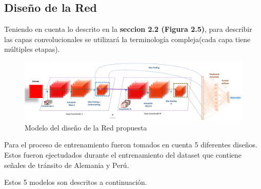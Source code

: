 	\subsection{Diseño de la Red}
	
	Teniendo en cuenta lo descrito en la {\bf seccion 2.2 (Figura 2.5)}, para describir las capas convolucionales se utilizará la terminología compleja(cada capa tiene múltiples etapas).
	
		\begin{figure}[H]
		\includegraphics[width=1\textwidth]{images/desarrollo/networkArquitec/designNet}
		\begin{center}
		\caption{\small{Modelo del diseño de la Red propuesta}}
		
		{\small{\fontsize{10}{16.8}\selectfont {Fuente: Elaboración propia}}}
		\end{center}
		\vspace{-1.5em}
		\end{figure}
















	Para el proceso de entrenamiento fueron tomados en cuenta 5 diferentes diseños. Estos fueron ejectudados durante el entrenamiento del dataset que contiene señales de tránsito de Alemania y Perú.

	Estos 5 modelos son descritos a continuación.
		\newpage
